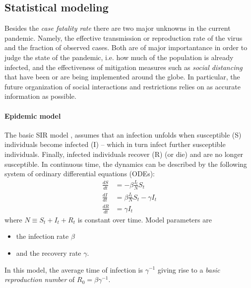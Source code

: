 \documentclass[a4paper]{tufte-handout}
\begin{document}
\subsection{Statistical modeling}

Besides the {\em case fatality rate} there are two major unknowns in
the current pandemic. Namely, the effective transmission or
reproduction rate of the virus and the fraction of observed
cases. Both are of major importantance in order to judge the state of
the pandemic, i.e. how much of the population is already infected, and
the effectiveness of mitigation measures such as {\em social
  distancing} that have been or are being implemented around the
globe. In particular, the future organization of social interactions
and restrictions relies on as accurate information as possible.

\paragraph{Epidemic model}
The basic SIR model \cite{Newman}, assumes that an infection unfolds when
susceptible (S) individuals become infected (I) -- which in turn
infect further susceptible individuals. Finally, infected individuals
recover (R) (or die) and are no longer susceptible. In continuous
time, the dynamics can be described by the following system of
ordinary differential equations (ODEs):
\begin{align*}
  \frac{dS}{dt} &= - \beta \frac{I_t}{N} S_t \\
  \frac{dI}{dt} &= \beta \frac{I_t}{N} S_t - \gamma I_t \\
  \frac{dR}{dt} &= \gamma I_t
\end{align*}
where $N \equiv S_t + I_t + R_t$ is constant over time. Model
parameters are
\begin{itemize}
\item the infection rate $\beta$
\item and the recovery rate $\gamma$.
\end{itemize}
In this model, the average time of infection is $\gamma^{-1}$ giving
rise to a {\em basic reproduction number} of $R_0 = \beta
\gamma^{-1}$.
\end{document}
